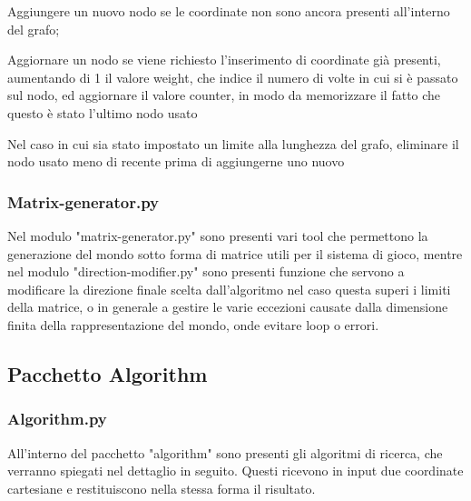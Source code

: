 Aggiungere un nuovo nodo se le coordinate non sono ancora presenti all'interno del grafo;

Aggiornare un nodo se viene richiesto l'inserimento di coordinate già presenti, aumentando di 1 il valore weight, che indice il numero di volte in cui si è passato sul nodo, ed aggiornare il valore counter, in modo da memorizzare il fatto che questo è stato l'ultimo nodo usato

Nel caso in cui sia stato impostato un limite alla lunghezza del grafo, eliminare il nodo usato meno di recente prima di aggiungerne uno nuovo
\subsubsection{Matrix-generator.py}
Nel modulo "matrix-generator.py" sono presenti vari tool che permettono la generazione del mondo sotto forma di matrice utili per il sistema di gioco, mentre nel modulo "direction-modifier.py" sono presenti funzione che servono a modificare la direzione finale scelta dall'algoritmo nel caso questa superi i limiti della matrice, o in generale a gestire le varie eccezioni causate dalla dimensione finita della rappresentazione del mondo, onde evitare loop o errori. 

\subsection{Pacchetto Algorithm}

\subsubsection{Algorithm.py}
All'interno del pacchetto "algorithm" sono presenti gli algoritmi di ricerca, che verranno spiegati nel dettaglio in seguito. Questi ricevono in input due coordinate cartesiane e restituiscono nella stessa forma il risultato.
	
